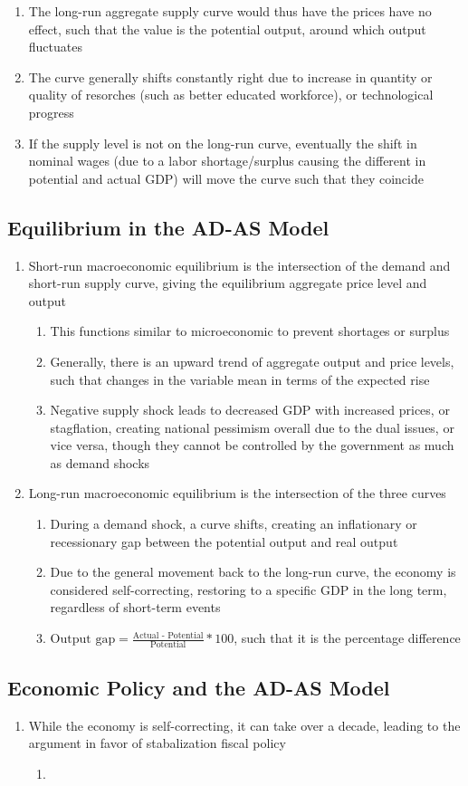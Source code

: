 \documentclass[11 pt, twoside]{article}
\begin{document}
\begin{enumerate}
\begin{enumerate}
\item The long-run aggregate supply curve would thus have the prices have no effect, such that the value is the potential output, around which output fluctuates
\item The curve generally shifts constantly right due to increase in quantity or quality of resorches (such as better educated workforce), or technological progress
\item If the supply level is not on the long-run curve, eventually the shift in nominal wages (due to a labor shortage/surplus causing the different in potential and actual GDP) will move the curve such that they coincide
\end{enumerate}
\end{enumerate}

\subsection{Equilibrium in the AD-AS Model}
\begin{enumerate}
\item Short-run macroeconomic equilibrium is the intersection of the demand and short-run supply curve, giving the equilibrium aggregate price level and output
\begin{enumerate}
\item This functions similar to microeconomic to prevent shortages or surplus
\item Generally, there is an upward trend of aggregate output and price levels, such that changes in the variable mean in terms of the expected rise
\item Negative supply shock leads to decreased GDP with increased prices, or stagflation, creating national pessimism overall due to the dual issues, or vice versa, though they cannot be controlled by the government as much as demand shocks 
\end{enumerate}
\item Long-run macroeconomic equilibrium is the intersection of the three curves 
\begin{enumerate}
\item During a demand shock, a curve shifts, creating an inflationary or recessionary gap between the potential output and real output
\item Due to the general movement back to the long-run curve, the economy is considered self-correcting, restoring to a specific GDP in the long term, regardless of short-term events
\item $\text{Output gap} = \frac{\text{Actual - Potential}}{\text{Potential}}*100$, such that it is the percentage difference
\end{enumerate}
\end{enumerate}

\subsection{Economic Policy and the AD-AS Model}
\begin{enumerate}
\item While the economy is self-correcting, it can take over a decade, leading to the argument in favor of stabalization fiscal policy
\begin{enumerate}
\item 
\end{enumerate}
\end{enumerate}
\end{document}
